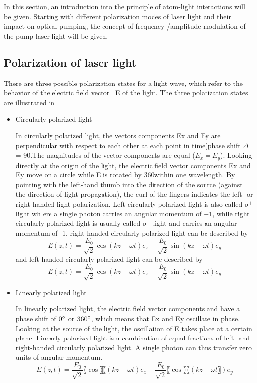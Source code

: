 \documentclass[12pt]{report}
\begin{document}
In this section, an introduction into the principle of atom-light interactions will be given. Starting with different polarization modes of laser light and their impact on optical pumping, the concept of frequency /amplitude modulation of the pump laser light will be given.

\subsection{Polarization of laser light} 
There are three possible polarization states for a light wave, which refer to the behavior of the electric field vector ~E of the light. The three polarization states are illustrated in

\begin{itemize}
\item Circularly polarized light

In circularly polarized light, the vectors components Ex and Ey are perpendicular with respect to each other at each point in time(phase shift $\Delta$ = 90\degree.The magnitudes of the vector components are equal ($E_x = E_y$). Looking directly at the origin of the light, the electric field vector components Ex and Ey move on a circle while E is rotated by 360\degree within one wavelength. By pointing with the left-hand thumb into the direction of the source (against the direction of light propagation), the curl of the fingers indicates the left- or right-handed light polarization. Left circularly polarized light is also called $ \sigma^+$ light wh
ere a single photon carries an angular momentum of +1, while right circularly polarized light is usually called $\sigma^-$ light and carries an angular momentum of -1.
\medskip
right-handed circularly polarized light can be described by
\begin{equation}
     E(z,t)=\frac{E_0}{\sqrt{2}} \cos⁡(kz-\omega t)e_x+\frac{E_0}{\sqrt{2}}  \sin ⁡(kz-\omega t)e_y
\end{equation}
and left-handed circularly polarized light can be described by
\begin{equation}
     E(z,t)=\frac{E_0}{\sqrt{2}} \cos⁡(kz-\omega t)e_x-\frac{E_0}{\sqrt{2}} \sin⁡ (kz-\omega t)e_y
\end{equation}
\end{itemize}
\begin{itemize}
\item Linearly polarized light

In linearly polarized light, the electric field vector components  and  have a phase shift of $0 \degree$ or $360\degree$, which means that Ex and Ey oscillate in phase. Looking at the source of the light, the oscillation of E takes place at a certain plane. Linearly polarized light is a combination of equal fractions of left- and right-handed circularly polarized light. A single photon can thus transfer zero units of angular momentum. 
\begin{equation}
     E(z,t)=\frac{E_0}{\sqrt{2}}〖\cos〗⁡〖(kz-\omega t)e_x-\frac{E_0}{\sqrt{2}}〖\cos〗⁡〖(kz-\omega t〗)e_y
\end{equation}
\end{itemize}
\end{document}
